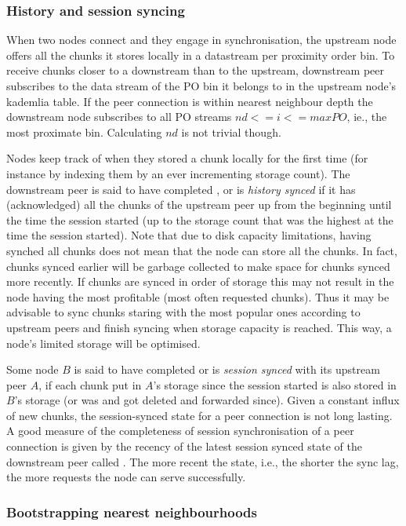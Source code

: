 \subsubsection{History and session syncing}

When two nodes connect and they engage in synchronisation, the upstream node offers all the chunks it stores locally in a datastream per proximity order bin. To receive chunks closer to a downstream than to the upstream, downstream peer subscribes to the data stream of the PO bin it belongs to in the upstream node's kademlia table.
If the peer connection is within nearest neighbour depth the downstream node subscribes to all PO streams $nd<=i<=\mathit{maxPO}$, ie., the most proximate bin. Calculating $nd$ is not trivial though. 

Nodes keep track of when they stored a chunk locally for the first time (for instance by indexing them by an ever incrementing storage count). The downstream peer is said to have completed , or is \emph{history synced} if it has (acknowledged) all the chunks of the upstream peer up from the beginning until the time the session started (up to the storage count that was the highest at the time the session
started). Note that due to disk capacity limitations, having synched all chunks does not mean that the node can store all the chunks. In fact, chunks  synced earlier will be garbage collected to make space for chunks synced more recently. If chunks are synced in order of storage this may not result in the node having the most profitable (most often requested chunks). Thus it may be advisable to sync chunks staring with the most popular ones according to upstream peers and finish syncing when storage capacity is reached. This way, a node's limited storage will be optimised. 


Some node $B$ is said to have completed  or is \emph{session synced} with its upstream peer $A$, if each chunk put in $A$'s storage since the session started is also stored in $B$'s storage (or was and got deleted and forwarded since). Given a constant influx of new chunks, the session-synced state for a peer connection is not long lasting. A good measure of the completeness of session synchronisation of a peer connection is given by the recency of the latest session synced state of the downstream peer called . The more recent the state, i.e., the shorter the sync lag, the more requests the node can serve successfully. 

\subsubsection{Bootstrapping nearest neighbourhoods}

